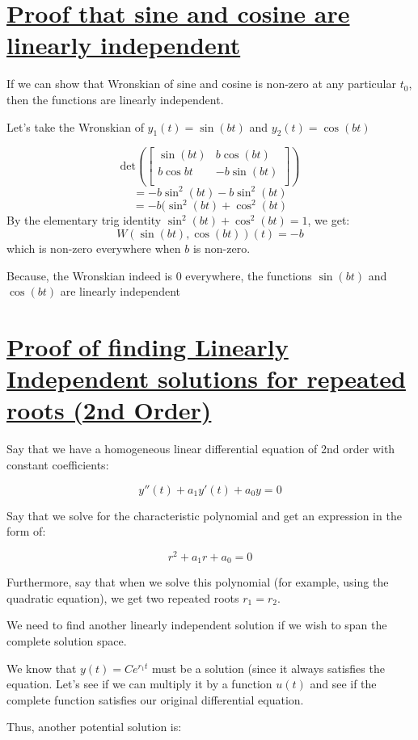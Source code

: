 \documentclass{report}
\begin{document}
{\section{\hyperref[sinLin]{Proof that sine and cosine are linearly independent}}
\label{sec:prSinLin}
If we can show that Wronskian of sine and cosine is non-zero at any particular $t_0$, then the functions are linearly independent.

Let's take the Wronskian of $y_1(t) = \sin(bt)$ and $y_2(t) = \cos(bt)$

$$
    \text{det}\left(\begin{bmatrix}
        \sin(bt) & b\cos(bt)\\
        b\cos{bt} & -b\sin(bt) \\
    \end{bmatrix}\right)
$$
$$=-b\sin^2(bt)-b\sin^2(bt)$$
$$=-b(\sin^2(bt) + \cos^2(bt)$$
By the elementary trig identity $\sin^2(bt) + \cos^2(bt) = 1$, we get:
$$W(\sin(bt),\cos(bt))(t)=-b$$
which is non-zero everywhere when $b$ is non-zero.

Because, the Wronskian indeed is 0 everywhere, the functions $\sin(bt)$ and $\cos(bt)$ are linearly independent


\section{\hyperref[repRoot]{Proof of finding Linearly Independent solutions for repeated roots (2nd Order)}}
\label{sec:PrRepRoot}
Say that we have a homogeneous linear differential equation of 2nd order with constant coefficients:

$$y''(t) + a_1y'(t) + a_0y = 0$$

Say that we solve for the characteristic polynomial and get an expression in the form of:

$$r^2 + a_1r + a_0 = 0$$

Furthermore, say that when we solve this polynomial (for example, using the quadratic equation), we get two repeated roots $r_1=r_2$.

We need to find another linearly independent solution if we wish to span the complete solution space.

We know that $y(t) = Ce^{r_1t}$ must be a solution (since it always satisfies the equation. Let's see if we can multiply it by a function $u(t)$ and see if the complete function satisfies our original differential equation.

Thus, another potential solution is:

}
\end{document}
